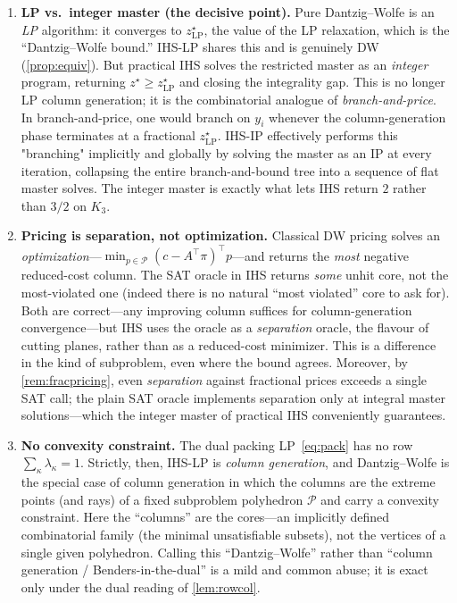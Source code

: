 \begin{enumerate}[label=\textbf{\arabic*.}, leftmargin=*]
\item \textbf{LP vs.\ integer master (the decisive point).}
Pure Dantzig--Wolfe is an \emph{LP} algorithm: it converges to
$z^\star_{\mathrm{LP}}$, the value of the LP relaxation, which is the
``Dantzig--Wolfe bound.'' IHS-LP shares this and is genuinely DW
(\cref{prop:equiv}). But practical IHS solves the restricted master
as an \emph{integer} program, returning $z^\star \ge z^\star_{\mathrm{LP}}$ and
closing the integrality gap. This is no longer LP column generation; it is the
combinatorial analogue of \emph{branch-and-price}. In branch-and-price,
one would branch on $y_i$ whenever the column-generation phase terminates at a
fractional $z^\star_{\mathrm{LP}}$. IHS-IP effectively performs this "branching"
implicitly and globally by solving the master as an IP at every iteration,
collapsing the entire branch-and-bound tree into a sequence of flat master
solves. The integer master is exactly what lets IHS return $2$ rather than $3/2$
on $K_3$.

\item \textbf{Pricing is separation, not optimization.}
Classical DW pricing solves an \emph{optimization}---$\min_{p\in\mathcal{P}}
(c - A^\top\pi)^\top p$---and returns the \emph{most} negative reduced-cost
column. The SAT oracle in IHS returns \emph{some} unhit core, not the
most-violated one (indeed there is no natural ``most violated'' core to ask
for). Both are correct---any improving column suffices for column-generation
convergence---but IHS uses the oracle as a \emph{separation} oracle, the flavour
of cutting planes, rather than as a reduced-cost minimizer. This is a difference
in the kind of subproblem, even where the bound agrees. Moreover, by
\cref{rem:fracpricing}, even \emph{separation} against fractional prices
exceeds a single SAT call; the plain SAT oracle implements separation only at
integral master solutions---which the integer master of practical IHS
conveniently guarantees.

\item \textbf{No convexity constraint.}
The dual packing LP~\eqref{eq:pack} has no row $\sum_\kappa \lambda_\kappa = 1$.
Strictly, then, IHS-LP is \emph{column generation}, and Dantzig--Wolfe is the
special case of column generation in which the columns are the extreme points
(and rays) of a fixed subproblem polyhedron $\mathcal{P}$ and carry a convexity
constraint. Here the ``columns'' are the cores---an implicitly defined
combinatorial family (the minimal unsatisfiable subsets), not the vertices of a
single given polyhedron. Calling this ``Dantzig--Wolfe'' rather than ``column
generation / Benders-in-the-dual'' is a mild and common abuse; it is exact only
under the dual reading of \cref{lem:rowcol}.


\end{enumerate}
